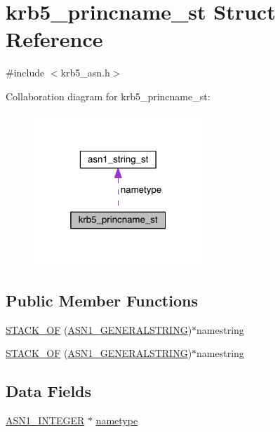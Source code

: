\hypertarget{structkrb5__princname__st}{}\section{krb5\+\_\+princname\+\_\+st Struct Reference}
\label{structkrb5__princname__st}


{\ttfamily \#include $<$krb5\+\_\+asn.\+h$>$}



Collaboration diagram for krb5\+\_\+princname\+\_\+st\+:\nopagebreak
\begin{figure}[H]
\begin{center}
\leavevmode
\includegraphics[width=181pt]{structkrb5__princname__st__coll__graph}
\end{center}
\end{figure}
\subsection*{Public Member Functions}
\begin{DoxyCompactItemize}
\item 
\hyperlink{structkrb5__princname__st_a25da91a1126d876ca6fed0c128fcd1c3}{S\+T\+A\+C\+K\+\_\+\+OF} (\hyperlink{crypto_2ossl__typ_8h_a7357d22f3b42ad606a72aad7f1668dd3}{A\+S\+N1\+\_\+\+G\+E\+N\+E\+R\+A\+L\+S\+T\+R\+I\+NG})$\ast$namestring
\item 
\hyperlink{structkrb5__princname__st_a25da91a1126d876ca6fed0c128fcd1c3}{S\+T\+A\+C\+K\+\_\+\+OF} (\hyperlink{crypto_2ossl__typ_8h_a7357d22f3b42ad606a72aad7f1668dd3}{A\+S\+N1\+\_\+\+G\+E\+N\+E\+R\+A\+L\+S\+T\+R\+I\+NG})$\ast$namestring
\end{DoxyCompactItemize}
\subsection*{Data Fields}
\begin{DoxyCompactItemize}
\item 
\hyperlink{crypto_2ossl__typ_8h_af4335399bf9774cb410a5e93de65998b}{A\+S\+N1\+\_\+\+I\+N\+T\+E\+G\+ER} $\ast$ \hyperlink{structkrb5__princname__st_aa63f2e81a241cb2570a9fe3918a4817c}{nametype}
\end{DoxyCompactItemize}


